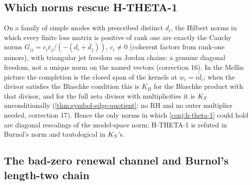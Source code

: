 \subsection{Which norms rescue H-THETA-1}

\begin{theorem}
\label{thm:sonine-one-exit-norm-classification}
On a family of simple modes with prescribed distinct $d_i$, the Hilbert norms in which every finite loss matrix is
positive of rank one are exactly the Cauchy norms $G_{ij} = c_i\bar c_j/(-(d_i+\bar d_j))$, $c_i\ne0$ (coherent factors from
rank-one minors), with triangular jet freedom on Jordan chains: a genuine diagonal freedom, not a unique norm on the named
vectors (correction 16). In the Mellin picture the completion is the closed span of the kernels at $w_i = i\bar d_i$; when
the divisor satisfies the Blaschke condition this is $K_B$ for the Blaschke product with that divisor, and for the full
zeta divisor with multiplicities it is $K_S$ unconditionally (\cref{thm:symbol-edge-quotient}: no RH and no outer
multiplier needed, correction 17). Hence the only norms in which \cref{conj:h-theta-1} could hold are diagonal
rescalings of the model-space norm: H-THETA-1 is refuted in Burnol's norm and tautological in $K_S$'s.
\end{theorem}

\subsection{The bad-zero renewal channel and Burnol's length-two chain}

